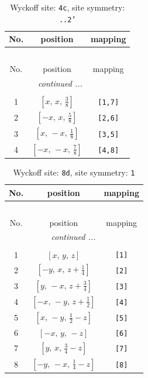 \documentclass[fleqn,8pt]{jsarticle}
\begin{document}
\renewcommand{\arraystretch}{1.2}
\begin{longtable}{ccc}
\caption{Wyckoff site: {\tt 4c}, site symmetry: {\tt ..2'}}
 \\
 \hline \hline
No. & position & mapping \\ \hline \endfirsthead

\multicolumn{2}{l}{\tablename\ \thetable{}} \\
 \hline \hline
No. & position & mapping \\ \hline \endhead

 \hline \hline
\multicolumn{2}{r}{\footnotesize\it continued ...} \\ \endfoot

 \hline \hline
\multicolumn{2}{r}{} \\ \endlastfoot

1 & $\left[ x,\, x,\, \frac{3}{8} \right]$ & {\tt [1,7]} \\ \hline
2 & $\left[ - x,\, x,\, \frac{5}{8} \right]$ & {\tt [2,6]} \\ \hline
3 & $\left[ x,\, - x,\, \frac{1}{8} \right]$ & {\tt [3,5]} \\ \hline
4 & $\left[ - x,\, - x,\, \frac{7}{8} \right]$ & {\tt [4,8]} \\
\end{longtable}
\renewcommand{\arraystretch}{1.2}
\begin{longtable}{ccc}
\caption{Wyckoff site: {\tt 8d}, site symmetry: {\tt 1}}
 \\
 \hline \hline
No. & position & mapping \\ \hline \endfirsthead

\multicolumn{2}{l}{\tablename\ \thetable{}} \\
 \hline \hline
No. & position & mapping \\ \hline \endhead

 \hline \hline
\multicolumn{2}{r}{\footnotesize\it continued ...} \\ \endfoot

 \hline \hline
\multicolumn{2}{r}{} \\ \endlastfoot

1 & $\left[ x,\, y,\, z \right]$ & {\tt [1]} \\ \hline
2 & $\left[ - y,\, x,\, z + \frac{1}{4} \right]$ & {\tt [2]} \\ \hline
3 & $\left[ y,\, - x,\, z + \frac{3}{4} \right]$ & {\tt [3]} \\ \hline
4 & $\left[ - x,\, - y,\, z + \frac{1}{2} \right]$ & {\tt [4]} \\ \hline
5 & $\left[ x,\, - y,\, \frac{1}{2} - z \right]$ & {\tt [5]} \\ \hline
6 & $\left[ - x,\, y,\, - z \right]$ & {\tt [6]} \\ \hline
7 & $\left[ y,\, x,\, \frac{3}{4} - z \right]$ & {\tt [7]} \\ \hline
8 & $\left[ - y,\, - x,\, \frac{1}{4} - z \right]$ & {\tt [8]} \\
\end{longtable}
\end{document}
